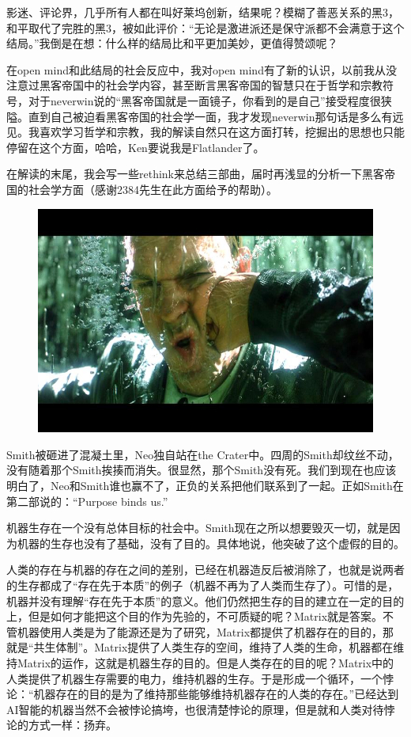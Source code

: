 \documentclass[UTF8]{ctexart}
\begin{document}
影迷、评论界，几乎所有人都在叫好莱坞创新，结果呢？模糊了善恶关系的黑3，和平取代了完胜的黑3，被如此评价：“无论是激进派还是保守派都不会满意于这个结局。”我倒是在想：什么样的结局比和平更加美妙，更值得赞颂呢？

在open mind和此结局的社会反应中，我对open mind有了新的认识，以前我从没注意过黑客帝国中的社会学内容，甚至断言黑客帝国的智慧只在于哲学和宗教符号，对于neverwin说的“黑客帝国就是一面镜子，你看到的是自己”接受程度很狭隘。直到自己被迫看黑客帝国的社会学一面，我才发现neverwin那句话是多么有远见。我喜欢学习哲学和宗教，我的解读自然只在这方面打转，挖掘出的思想也只能停留在这个方面，哈哈，Ken要说我是Flatlander了。

在解读的末尾，我会写一些rethink来总结三部曲，届时再浅显的分析一下黑客帝国的社会学方面（感谢2384先生在此方面给予的帮助）。

\begin{figure}[htb]
\centering
\includegraphics[width=0.5\linewidth]{fig/1263a08b2c62f97c9f2fb47f.jpg}
\end{figure}

Smith被砸进了混凝土里，Neo独自站在the Crater中。四周的Smith却纹丝不动，没有随着那个Smith挨揍而消失。很显然，那个Smith没有死。我们到现在也应该明白了，Neo和Smith谁也赢不了，正负的关系把他们联系到了一起。正如Smith在第二部说的：“Purpose binds us.”

机器生存在一个没有总体目标的社会中。Smith现在之所以想要毁灭一切，就是因为机器的生存也没有了基础，没有了目的。具体地说，他突破了这个虚假的目的。

人类的存在与机器的存在之间的差别，已经在机器造反后被消除了，也就是说两者的生存都成了“存在先于本质”的例子（机器不再为了人类而生存了）。可惜的是，机器并没有理解“存在先于本质”的意义。他们仍然把生存的目的建立在一定的目的上，但是如何才能把这个目的作为先验的，不可质疑的呢？Matrix就是答案。不管机器使用人类是为了能源还是为了研究，Matrix都提供了机器存在的目的，那就是“共生体制”。Matrix提供了人类生存的空间，维持了人类的生命，机器都在维持Matrix的运作，这就是机器生存的目的。但是人类存在的目的呢？Matrix中的人类提供了机器生存需要的电力，维持机器的生存。于是形成一个循环，一个悖论：“机器存在的目的是为了维持那些能够维持机器存在的人类的存在。”已经达到AI智能的机器当然不会被悖论搞垮，也很清楚悖论的原理，但是就和人类对待悖论的方式一样：扬弃。
\end{document}
